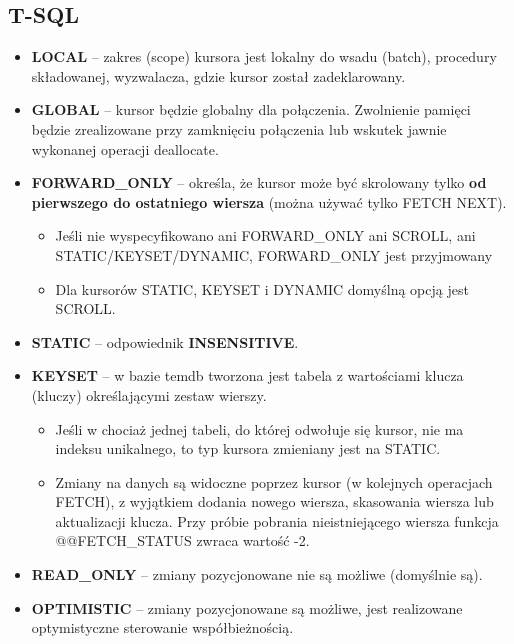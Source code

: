 \documentclass[a4paper]{article}
\begin{document}
    \subsection{T-SQL}
    \begin{itemize}[noitemsep]
        \item \textbf{LOCAL} – zakres (scope) kursora jest lokalny do wsadu (batch), procedury składowanej, wyzwalacza,
        gdzie kursor został zadeklarowany.
        \item \textbf{GLOBAL} – kursor będzie globalny dla
        połączenia. Zwolnienie pamięci będzie zrealizowane przy zamknięciu połączenia lub wskutek jawnie wykonanej
        operacji deallocate.
        \item \textbf{FORWARD\_ONLY} – określa, że kursor może być skrolowany tylko \textbf{od pierwszego do ostatniego
        wiersza} (można używać tylko FETCH NEXT).
        \begin{itemize}[noitemsep]
            \item Jeśli nie wyspecyfikowano ani FORWARD\_ONLY ani SCROLL, ani STATIC/KEYSET/DYNAMIC, FORWARD\_ONLY jest
            przyjmowany
            \item Dla kursorów STATIC, KEYSET i DYNAMIC domyślną opcją jest SCROLL.
        \end{itemize}
        \item \textbf{STATIC} – odpowiednik \textbf{INSENSITIVE}.
        \item \textbf{KEYSET} – w bazie temdb tworzona jest tabela z wartościami klucza (kluczy) określającymi zestaw
        wierszy.
        \begin{itemize}[noitemsep]
            \item Jeśli w chociaż jednej tabeli, do której odwołuje się kursor, nie ma indeksu unikalnego, to typ
            kursora zmieniany jest na STATIC.
            \item Zmiany na danych są widoczne poprzez kursor (w kolejnych operacjach FETCH), z wyjątkiem dodania nowego
            wiersza, skasowania wiersza lub aktualizacji klucza. Przy próbie pobrania nieistniejącego wiersza funkcja
            @@FETCH\_STATUS zwraca wartość -2.
        \end{itemize}
        \item \textbf{READ\_ONLY} – zmiany pozycjonowane nie są możliwe (domyślnie są).
        \item \textbf{OPTIMISTIC} – zmiany pozycjonowane są możliwe, jest realizowane optymistyczne sterowanie
        współbieżnością.

\end{itemize}
\end{document}
